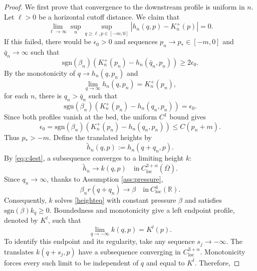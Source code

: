 \documentclass[12pt,letterpaper]{amsart}
\numberwithin{equation}{section}
\def\R{{\mathbb R}}
\def\sgn{\mathrm{sgn}}
\begin{document}
\begin{proof}
	{We first prove that convergence to the downstream profile is uniform in $n$. Let $\ell>0$ be a horizontal cutoff distance. We claim that}
	\begin{equation}\label{uniformdown}
		{\lim_{\ell\to\infty}\sup_n\sup_{q\geq\ell,p\in[-m,0]}}|h_n(q,p)-K_n^+(p)|=0.
	\end{equation}
	{If this failed, there would be $\epsilon_0>0$ and sequences $p_n\to p_*\in[-m,0]$ and $\bar q_n\to\infty$ such that}
	\begin{equation*}
		\sgn(\beta_n)(K_n^+(p_n)-h_n(\bar q_n,p_n))\geq2\epsilon_0.
	\end{equation*}
	By the monotonicity of $q\to h_n(q,p_n)$ and
	\begin{equation*}
		\lim_{q\to\infty}h_n(q,p_n)=K_n^+(p_n),
	\end{equation*}
	{for each $n$, there is $q_n>\bar q_n$ such that}
	\begin{equation}\label{eq:cross}
		\sgn(\beta_n)(K_n^+(p_n)-h_n( q_n,p_n))=\epsilon_0.
	\end{equation}
	{Since both profiles vanish at the bed, the uniform $C^1$ bound gives}
	\begin{equation*}
		\epsilon_0=\sgn(\beta_n)(K_n^+(p_n)-h_n( q_n,p_n))\leq C(p_n+m).
	\end{equation*}
	{Thus $p_*>-m$. Define the translated heights by}
	\begin{equation*}
		\tilde{h}_n(q,p):=h_n(q+q_n,p).
	\end{equation*}
	{By \eqref{eq:c4est}, a subsequence converges to a limiting height $k$:}
	\begin{equation*}
		\tilde h_n\to k(q,p)\quad\mathrm{in~}C_{\mathrm{loc}}^{3+\alpha}(\overline\Omega).
	\end{equation*}
	Since $q_n\to\infty$, thanks to Assumption \ref{ass:pressure},
	\begin{equation*}
		\beta_n r(q+q_n)\to\beta\quad\mathrm{in~}C_{\mathrm{loc}}^{4}(\R).
	\end{equation*}
	{Consequently, $k$ solves \eqref{heighteq} with constant pressure $\beta$ and satisfies $\sgn(\beta)k_q\geq0$. Boundedness and monotonicity give a left endpoint profile, denoted by $K^l$, such that}
	\begin{equation*}
		\lim_{q\to-\infty}k(q,p)=K^l(p).
	\end{equation*}
	{To identify this endpoint and its regularity, take any sequence $s_j\to-\infty$. The translates $k(q+s_j,p)$ have a subsequence converging in $C_{\mathrm{loc}}^{3+\alpha}$. Monotonicity forces every such limit to be independent of $q$ and equal to $K^l$. Therefore,}

\end{proof}
\end{document}
